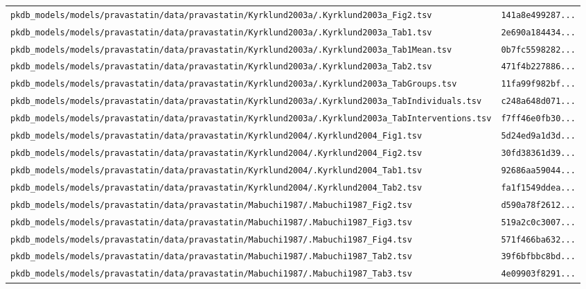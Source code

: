 \begin{longtable}{ll}
\texttt{pkdb\_models/models/pravastatin/data/pravastatin/Kyrklund2003a/.Kyrklund2003a\_Fig2.tsv} & \texttt{141a8e499287...} \\
\texttt{pkdb\_models/models/pravastatin/data/pravastatin/Kyrklund2003a/.Kyrklund2003a\_Tab1.tsv} & \texttt{2e690a184434...} \\
\texttt{pkdb\_models/models/pravastatin/data/pravastatin/Kyrklund2003a/.Kyrklund2003a\_Tab1Mean.tsv} & \texttt{0b7fc5598282...} \\
\texttt{pkdb\_models/models/pravastatin/data/pravastatin/Kyrklund2003a/.Kyrklund2003a\_Tab2.tsv} & \texttt{471f4b227886...} \\
\texttt{pkdb\_models/models/pravastatin/data/pravastatin/Kyrklund2003a/.Kyrklund2003a\_TabGroups.tsv} & \texttt{11fa99f982bf...} \\
\texttt{pkdb\_models/models/pravastatin/data/pravastatin/Kyrklund2003a/.Kyrklund2003a\_TabIndividuals.tsv} & \texttt{c248a648d071...} \\
\texttt{pkdb\_models/models/pravastatin/data/pravastatin/Kyrklund2003a/.Kyrklund2003a\_TabInterventions.tsv} & \texttt{f7ff46e0fb30...} \\
\texttt{pkdb\_models/models/pravastatin/data/pravastatin/Kyrklund2004/.Kyrklund2004\_Fig1.tsv} & \texttt{5d24ed9a1d3d...} \\
\texttt{pkdb\_models/models/pravastatin/data/pravastatin/Kyrklund2004/.Kyrklund2004\_Fig2.tsv} & \texttt{30fd38361d39...} \\
\texttt{pkdb\_models/models/pravastatin/data/pravastatin/Kyrklund2004/.Kyrklund2004\_Tab1.tsv} & \texttt{92686aa59044...} \\
\texttt{pkdb\_models/models/pravastatin/data/pravastatin/Kyrklund2004/.Kyrklund2004\_Tab2.tsv} & \texttt{fa1f1549ddea...} \\
\texttt{pkdb\_models/models/pravastatin/data/pravastatin/Mabuchi1987/.Mabuchi1987\_Fig2.tsv} & \texttt{d590a78f2612...} \\
\texttt{pkdb\_models/models/pravastatin/data/pravastatin/Mabuchi1987/.Mabuchi1987\_Fig3.tsv} & \texttt{519a2c0c3007...} \\
\texttt{pkdb\_models/models/pravastatin/data/pravastatin/Mabuchi1987/.Mabuchi1987\_Fig4.tsv} & \texttt{571f466ba632...} \\
\texttt{pkdb\_models/models/pravastatin/data/pravastatin/Mabuchi1987/.Mabuchi1987\_Tab2.tsv} & \texttt{39f6bfbbc8bd...} \\
\texttt{pkdb\_models/models/pravastatin/data/pravastatin/Mabuchi1987/.Mabuchi1987\_Tab3.tsv} & \texttt{4e09903f8291...} \\

\end{longtable}
